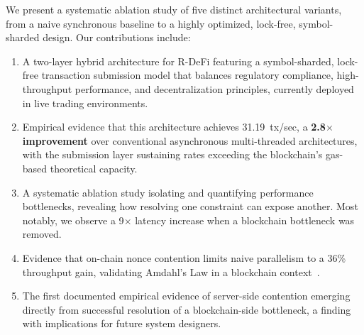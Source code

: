 We present a systematic ablation study of five distinct architectural variants, from a naive synchronous baseline to a highly optimized, lock-free, symbol-sharded design. Our contributions include:

\begin{enumerate}
    \item A two-layer hybrid architecture for R-DeFi featuring a symbol-sharded, lock-free transaction submission model that balances regulatory compliance, high-throughput performance, and decentralization principles, currently deployed in live trading environments.
    \item Empirical evidence that this architecture achieves 31.19~tx/sec, a \textbf{2.8$\times$ improvement} over conventional asynchronous multi-threaded architectures, with the submission layer sustaining rates exceeding the blockchain's gas-based theoretical capacity.
    \item A systematic ablation study isolating and quantifying performance bottlenecks, revealing how resolving one constraint can expose another. Most notably, we observe a 9$\times$ latency increase when a blockchain bottleneck was removed.
    \item Evidence that on-chain nonce contention limits naive parallelism to a 36\% throughput gain, validating Amdahl's Law in a blockchain context~\cite{amdahl1967validity}.
    \item The first documented empirical evidence of server-side contention emerging directly from successful resolution of a blockchain-side bottleneck, a finding with implications for future system designers.
\end{enumerate}


